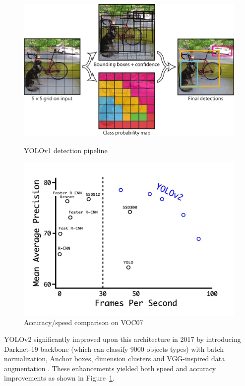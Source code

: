 \documentclass[12pt, a4paper]{article}
\begin{document}
\begin{figure}[h]
    \centering
    \begin{minipage}{0.45\textwidth}
        \centering
        \includegraphics[width=\linewidth]{pictures/yolov1_dog.pdf}
        \caption{YOLOv1 detection pipeline}
        \label{fig:yolov1_dog}
    \end{minipage}
    \hfill
    \begin{minipage}{0.45\textwidth}
        \centering
        \includegraphics[width=\linewidth]{pictures/yolov2.jpeg}
        \caption{Accuracy/speed comparison on VOC07}
        \label{fig:yolov2}
    \end{minipage}
\end{figure}

YOLOv2 \cite{yolov2} significantly improved upon this architecture in 2017 by introducing Darknet-19 backbone 
(which can classify 9000 objects types) with batch normalization, 
Anchor boxes, dimension clusters and VGG-inspired data augmentation \cite{vgg}.
These enhancements yielded both speed and accuracy improvements as shown in Figure~\ref{fig:yolov2}.
\end{document}
